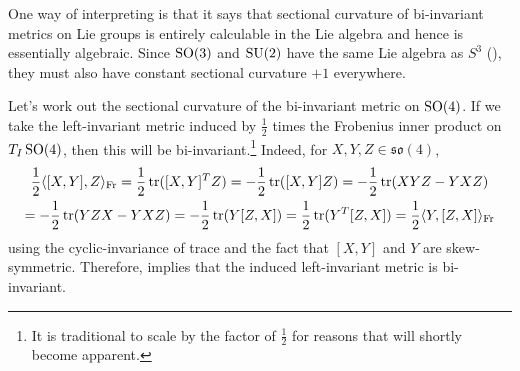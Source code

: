 One way of interpreting  is that it says that sectional curvature of bi-invariant metrics on Lie groups is entirely calculable in the Lie algebra and hence is essentially algebraic. Since $\operatorname{SO}(3)$ and $\operatorname{SU}(2)$ have the same Lie algebra as $S^3$ (), they must also have constant sectional curvature $+1$ everywhere.

\begin{example}\label{ex:SO(4) sectional curvature}
	Let's work out the sectional curvature of the bi-invariant metric on $\operatorname{SO}(4)$. If we take the left-invariant metric induced by $\frac{1}{2}$ times the Frobenius inner product on $T_I \operatorname{SO}(4)$, then this will be bi-invariant.\footnote{It is traditional to scale by the factor of $\frac{1}{2}$ for reasons that will shortly become apparent.} Indeed, for $X,Y,Z \in \mathfrak{so}(4)$,
	\begin{multline*}
		\frac{1}{2}\langle [X,Y],Z \rangle_{\text{Fr}} = \frac{1}{2}\operatorname{tr}([X,Y]^T Z) = -\frac{1}{2} \operatorname{tr}([X,Y]Z) = -\frac{1}{2}\operatorname{tr}(XYZ-YXZ) \\
		= -\frac{1}{2}\operatorname{tr}(YZX-YXZ) = -\frac{1}{2}\operatorname{tr}(Y[Z,X]) = \frac{1}{2}\operatorname{tr}(Y^T [Z,X]) = \frac{1}{2}\langle Y,[Z,X]\rangle_{\text{Fr}}
	\end{multline*}
	using the cyclic-invariance of trace and the fact that $[X,Y]$ and $Y$ are skew-symmetric. Therefore,  implies that the induced left-invariant metric is bi-invariant.
	

\end{example}
